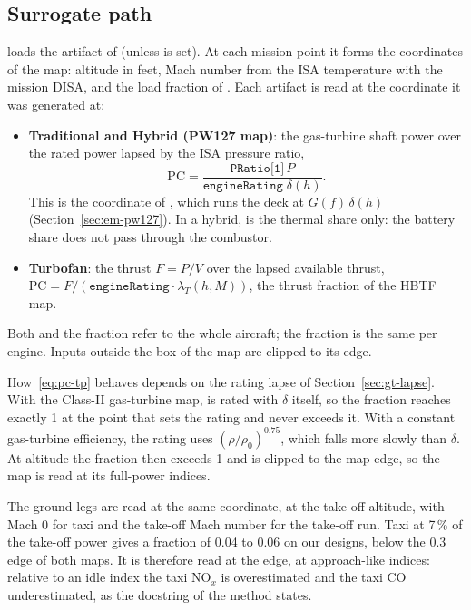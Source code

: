 \documentclass[a4paper,11pt]{article}
\begin{document}
\subsection{Surrogate path}\label{sec:em-path}
 loads the artifact of  (unless
 is set). At each mission point it forms the coordinates of
the map: altitude in feet, Mach number from the ISA temperature with the mission DISA, and the
load fraction of . Each artifact is read at the coordinate it was
generated at:
\begin{itemize}
\item \textbf{Traditional and Hybrid (PW127 map)}: the gas-turbine shaft power over the rated
  power lapsed by the ISA pressure ratio,
  \begin{equation}
    \mathrm{PC} = \frac{\texttt{PRatio[1]}\,P}{\texttt{engineRating}\;\delta(h)} .
    \label{eq:pc-tp}
  \end{equation}
  This is the coordinate of , which runs the deck at $G(f)\,\delta(h)$
  (Section~\ref{sec:em-pw127}). In a hybrid,  is the thermal share only: the
  battery share does not pass through the combustor.
\item \textbf{Turbofan}: the thrust $F = P/V$ over the lapsed available thrust,
  $\mathrm{PC} = F/(\texttt{engineRating}\cdot\lambda_T(h, M))$, the thrust fraction of the HBTF
  map.
\end{itemize}
Both  and the fraction refer to the whole aircraft; the fraction is the same
per engine. Inputs outside the box of the map are clipped to its edge.

How~\eqref{eq:pc-tp} behaves depends on the rating lapse of Section~\ref{sec:gt-lapse}. With the
Class-II gas-turbine map,  is rated with $\delta$ itself, so the fraction
reaches exactly 1 at the point that sets the rating and never exceeds it. With a constant
gas-turbine efficiency, the rating uses $(\rho/\rho_0)^{0.75}$, which falls more slowly than
$\delta$. At altitude the fraction then exceeds 1 and is clipped to the map edge, so the map is
read at its full-power indices.

The ground legs are read at the same coordinate, at the take-off altitude, with Mach 0 for taxi
and the take-off Mach number for the take-off run. Taxi at 7\,\% of the take-off power gives a
fraction of 0.04 to 0.06 on our designs, below the 0.3 edge of both maps. It is therefore read
at the edge, at approach-like indices: relative to an idle index the taxi NO$_x$ is
overestimated and the taxi CO underestimated, as the docstring of the method states.
\end{document}
